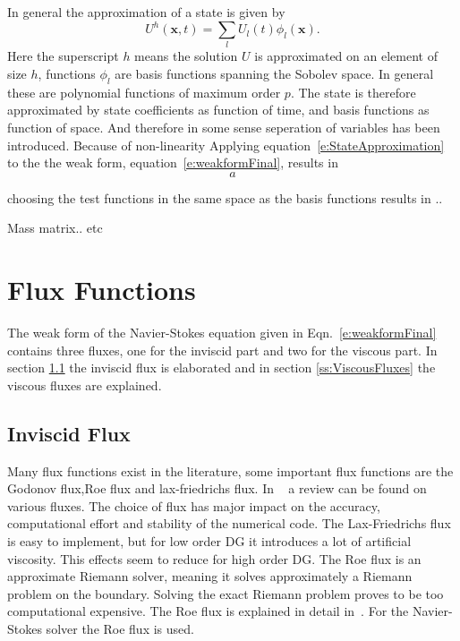 \documentclass{report}
\begin{document}
In general the approximation of a state is given by
\begin{equation}
\label{e:StateApproximation}
U^h(\mathbf{x},t) = \sum_l U_l(t) \phi_l(\mathbf{x}).
\end{equation}
Here the superscript $h$ means the solution $U$ is approximated on an element of size $h$, functions $\phi_l$ are basis functions spanning the Sobolev space. In general these are polynomial functions of maximum order $p$. The state is therefore approximated by state coefficients as function of time, and basis functions as function of space. And therefore in some sense seperation of variables has been introduced. Because of non-linearity
Applying equation~\ref{e:StateApproximation} to the the weak form, equation~\ref{e:weakformFinal}, results in
\begin{equation}
\label{e:DiscreteWeakForm}
a
\end{equation}

choosing the test functions in the same space as the basis functions results in ..

Mass matrix.. etc



\section{Flux Functions}
\label{s:fluxFunctions}
The weak form of the Navier-Stokes equation given in Eqn.~\ref{e:weakformFinal} contains three fluxes, one for the inviscid part and two for the viscous part. In section \ref{ss:Inviscidflux} the inviscid flux is elaborated and in section \ref{ss:ViscousFluxes} the viscous fluxes are explained.

\subsection{Inviscid Flux}
\label{ss:Inviscidflux}
Many flux functions exist in the literature, some important flux functions are the Godonov flux,Roe flux and lax-friedrichs flux. In ~\cite{} a review can be found on various fluxes. The choice of flux has major impact on the accuracy, computational effort and stability of the numerical code. The Lax-Friedrichs flux is easy to implement, but for low order DG it introduces a lot of artificial viscosity. This effects seem to reduce for high order DG. The Roe flux is an approximate Riemann solver, meaning it solves approximately a Riemann problem on the boundary. Solving the exact Riemann problem proves to be too computational expensive. The Roe flux is explained in detail in~\cite{}. For the Navier-Stokes solver the Roe flux is used.
\end{document}
